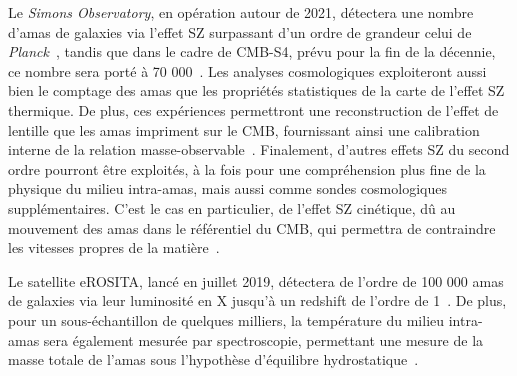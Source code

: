 Le \emph{Simons Observatory}, en opération autour de 2021, détectera
une nombre d'amas de galaxies via l'effet SZ surpassant d'un ordre de
grandeur celui de \emph{Planck}~\citep{SO2019}, tandis que dans le
cadre de CMB-S4, prévu pour la fin de la décennie, ce nombre sera
porté à 70 000~\citep{CMB-S4}. Les analyses cosmologiques exploiteront
aussi bien le comptage des amas que les propriétés statistiques de la
carte de l'effet SZ thermique. De plus, ces expériences permettront
une reconstruction de l'effet de lentille que les amas impriment sur
le CMB, fournissant ainsi une calibration interne de la relation
masse-observable~\citep{Melin2015, Louis2017}. Finalement, d'autres
effets SZ du second ordre pourront être exploités, à la fois pour une
compréhension plus fine de la physique du milieu intra-amas, mais
aussi comme sondes cosmologiques supplémentaires. C'est le cas en
particulier, de l'effet SZ cinétique, dû au mouvement des amas dans le
référentiel du CMB, qui permettra de contraindre les vitesses propres
de la matière~\citep{SO2019}.


Le satellite eROSITA, lancé en juillet 2019, détectera de l'ordre de
100 000 amas de galaxies via leur luminosité en X jusqu'à un redshift de
l'ordre de 1~\citep{eROSITA_cosmo}. De plus,
pour un sous-échantillon de quelques milliers, la température du
milieu intra-amas sera également mesurée par spectroscopie, permettant
une mesure de la masse totale de l'amas sous l'hypothèse d'équilibre
hydrostatique~\citep{Hofmann2017}. \\  

